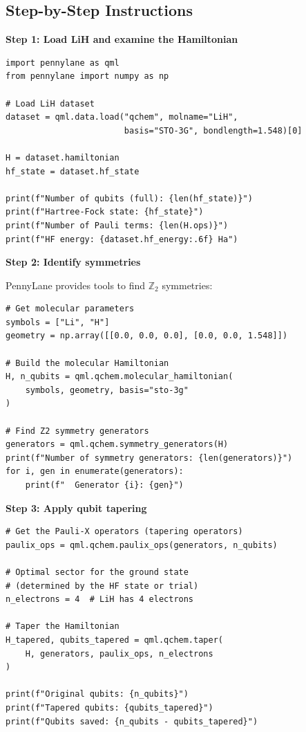 \documentclass[11pt,a4paper]{article}
\begin{document}
\subsection*{Step-by-Step Instructions}

\textbf{Step 1: Load LiH and examine the Hamiltonian}
\begin{lstlisting}
import pennylane as qml
from pennylane import numpy as np

# Load LiH dataset
dataset = qml.data.load("qchem", molname="LiH",
                        basis="STO-3G", bondlength=1.548)[0]

H = dataset.hamiltonian
hf_state = dataset.hf_state

print(f"Number of qubits (full): {len(hf_state)}")
print(f"Hartree-Fock state: {hf_state}")
print(f"Number of Pauli terms: {len(H.ops)}")
print(f"HF energy: {dataset.hf_energy:.6f} Ha")
\end{lstlisting}

\textbf{Step 2: Identify symmetries}

PennyLane provides tools to find $\mathbb{Z}_2$ symmetries:
\begin{lstlisting}
# Get molecular parameters
symbols = ["Li", "H"]
geometry = np.array([[0.0, 0.0, 0.0], [0.0, 0.0, 1.548]])

# Build the molecular Hamiltonian
H, n_qubits = qml.qchem.molecular_hamiltonian(
    symbols, geometry, basis="sto-3g"
)

# Find Z2 symmetry generators
generators = qml.qchem.symmetry_generators(H)
print(f"Number of symmetry generators: {len(generators)}")
for i, gen in enumerate(generators):
    print(f"  Generator {i}: {gen}")
\end{lstlisting}

\textbf{Step 3: Apply qubit tapering}
\begin{lstlisting}
# Get the Pauli-X operators (tapering operators)
paulix_ops = qml.qchem.paulix_ops(generators, n_qubits)

# Optimal sector for the ground state
# (determined by the HF state or trial)
n_electrons = 4  # LiH has 4 electrons

# Taper the Hamiltonian
H_tapered, qubits_tapered = qml.qchem.taper(
    H, generators, paulix_ops, n_electrons
)

print(f"Original qubits: {n_qubits}")
print(f"Tapered qubits: {qubits_tapered}")
print(f"Qubits saved: {n_qubits - qubits_tapered}")
\end{lstlisting}
\end{document}
